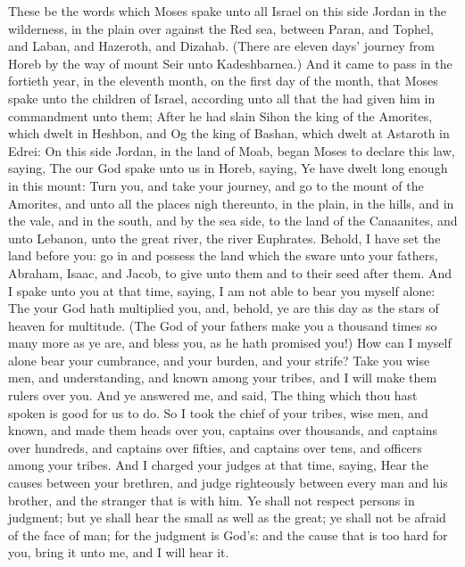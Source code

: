 
\begin{biblechapter} %
 These be the words which Moses spake unto all Israel on this side Jordan in the wilderness, in the plain over against the Red sea, between Paran, and Tophel, and Laban, and Hazeroth, and Dizahab.
\verse (There are eleven days' journey from Horeb by the way of mount Seir unto Kadeshbarnea.)
\verse And it came to pass in the fortieth year, in the eleventh month, on the first day of the month, that Moses spake unto the children of Israel, according unto all that the \LORD had given him in commandment unto them;
\verse After he had slain Sihon the king of the Amorites, which dwelt in Heshbon, and Og the king of Bashan, which dwelt at Astaroth in Edrei:
\verse On this side Jordan, in the land of Moab, began Moses to declare this law, saying,
\verse The \LORD our God spake unto us in Horeb, saying, Ye have dwelt long enough in this mount:
\verse Turn you, and take your journey, and go to the mount of the Amorites, and unto all the places nigh thereunto, in the plain, in the hills, and in the vale, and in the south, and by the sea side, to the land of the Canaanites, and unto Lebanon, unto the great river, the river Euphrates.
\verse Behold, I have set the land before you: go in and possess the land which the \LORD sware unto your fathers, Abraham, Isaac, and Jacob, to give unto them and to their seed after them.
 And I spake unto you at that time, saying, I am not able to bear you myself alone:
\verse The \LORD your God hath multiplied you, and, behold, ye are this day as the stars of heaven for multitude.
\verse (The \LORD God of your fathers make you a thousand times so many more as ye are, and bless you, as he hath promised you!)
\verse How can I myself alone bear your cumbrance, and your burden, and your strife?
\verse Take you wise men, and understanding, and known among your tribes, and I will make them rulers over you.
\verse And ye answered me, and said, The thing which thou hast spoken is good for us to do.
\verse So I took the chief of your tribes, wise men, and known, and made them heads over you, captains over thousands, and captains over hundreds, and captains over fifties, and captains over tens, and officers among your tribes.
\verse And I charged your judges at that time, saying, Hear the causes between your brethren, and judge righteously between every man and his brother, and the stranger that is with him.
\verse Ye shall not respect persons in judgment; but ye shall hear the small as well as the great; ye shall not be afraid of the face of man; for the judgment is God's: and the cause that is too hard for you, bring it unto me, and I will hear it.

\end{biblechapter}

